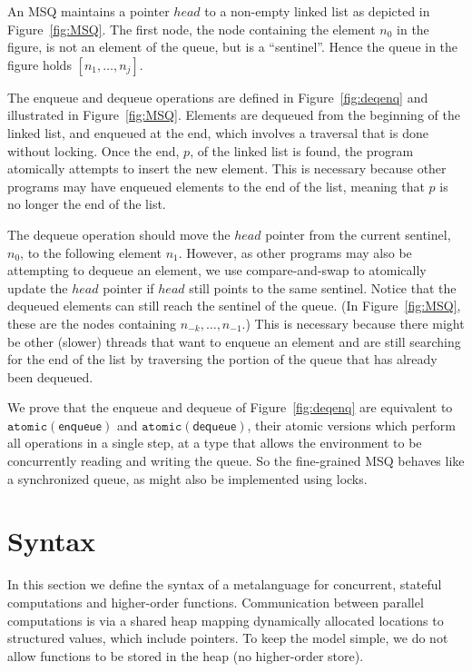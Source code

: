 \documentclass[nocopyrightspace,preprint]{sigplanconf}
\newcommand{\keywd}[1]{\mathtt{#1}}
\newcommand{\myatomic}[1]{\keywd{atomic}(#1)}
\begin{document}
 An MSQ maintains a pointer $head$ to a non-empty linked list as depicted in Figure~\ref{fig:MSQ}. The first node, the node containing the element $n_0$ in the figure, is not an element of the queue, but is a ``sentinel''. Hence the queue in the figure holds $[n_1, \ldots, n_j]$. 
 
 The enqueue and dequeue operations are defined in Figure~\ref{fig:deqenq} and illustrated in Figure~\ref{fig:MSQ}.
 Elements are dequeued from the beginning of the linked list, and enqueued at the end, which involves a traversal that is done without locking.
Once the end, $p$, of the linked list is found, the program atomically attempts to insert the new element. This is necessary because other programs may have enqueued elements to the end of the list, meaning that $p$ is no longer the end of the list. 
   
 The dequeue operation should move the $head$ pointer from the current
 sentinel, $n_0$, to the following element $n_1$. However, as other
 programs may also be attempting to dequeue an element, we use
 compare-and-swap to atomically update  the $head$ pointer if $head$
 still points to the same sentinel. Notice that the dequeued elements
 can still reach the sentinel of the queue. (In Figure~\ref{fig:MSQ},
 these are the nodes containing $n_{-k}, \ldots, n_{-1}$.)  This is
 necessary because there might be other (slower) threads that want to
 enqueue an element and are still searching for the end of the list
 by traversing the portion of the queue that has already been
 dequeued. 


 We prove  that the enqueue and dequeue of Figure~\ref{fig:deqenq} are equivalent to $\myatomic{\mathsf{enqueue}}$ and $\myatomic{\mathsf{dequeue}}$, their atomic versions 
which perform all operations in a single step, at a type that allows the environment to be concurrently reading and writing the queue.
So the fine-grained MSQ behaves like a synchronized queue, as might also be implemented using locks.
\section{Syntax}
\label{sec:syntax}
In this section we define the syntax of a metalanguage for concurrent, stateful
computations and higher-order functions. 
Communication between parallel computations is via a shared heap
mapping dynamically allocated locations to structured values, which
include pointers. To keep the model simple, we do not allow functions
to be stored in the heap (no higher-order store).
\end{document}
